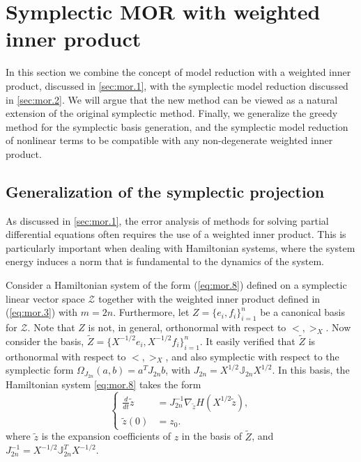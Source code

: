 \section{Symplectic MOR with weighted inner product} \label{sec:normmor}

In this section we combine the concept of model reduction with a weighted inner product, discussed in \cref{sec:mor.1}, with the symplectic model reduction discussed in \cref{sec:mor.2}. We will argue that the new method can be viewed as a natural extension of the original symplectic method. Finally, we generalize the greedy method for the symplectic basis generation, and the symplectic model reduction of nonlinear terms to be compatible with any non-degenerate weighted inner product.

\subsection{Generalization of the symplectic projection} \label{sec:normmor.1}
As discussed in \cref{sec:mor.1}, the error analysis of methods for solving partial differential equations often requires the use of a weighted inner product. This is particularly important when dealing with Hamiltonian systems, where the system energy induces a norm that is fundamental to the dynamics of the system.
   
Consider a Hamiltonian system of the form (\ref{eq:mor.8}) defined on a symplectic linear vector space $\mathcal Z$ together with the weighted inner product defined in (\ref{eq:mor.3}) with $m=2n$. Furthermore, let $Z = \{ e_i,f_i \}_{i=1}^n$ be a canonical basis for $\mathcal Z$. Note that $Z$ is not, in general, orthonormal with respect to $<,>_X$. Now consider the basis, $\tilde Z = \{ X^{-1/2}e_i,X^{-1/2}f_i \}_{i=1}^{n}$. It easily verified that $\tilde Z$ is orthonormal with respect to $<,>_{X}$, and also symplectic with respect to the symplectic form $\Omega_{J_{2n}}(a,b) = a^T J_{2n} b $, with $J_{2n} = X^{1/2} \mathbb J_{2n}X^{1/2}$. In this basis, the Hamiltonian system \eqref{eq:mor.8} takes the form
\begin{equation} \label{p1.eq:nommor.0.1}
	\left\{
	\begin{aligned}
		\frac d {dt} \tilde z &= J^{-1}_{2n} \nabla_{\tilde z} H(X^{1/2}\tilde{z}), \\
		\tilde z(0) &= z_0.
	\end{aligned}
	\right.	
\end{equation}
where $\tilde z$ is the expansion coefficients of $z$ in the basis of $\tilde Z$, and $J_{2n}^{-1} = X^{-1/2} \mathbb J_{2n}^T X^{-1/2}$. 

